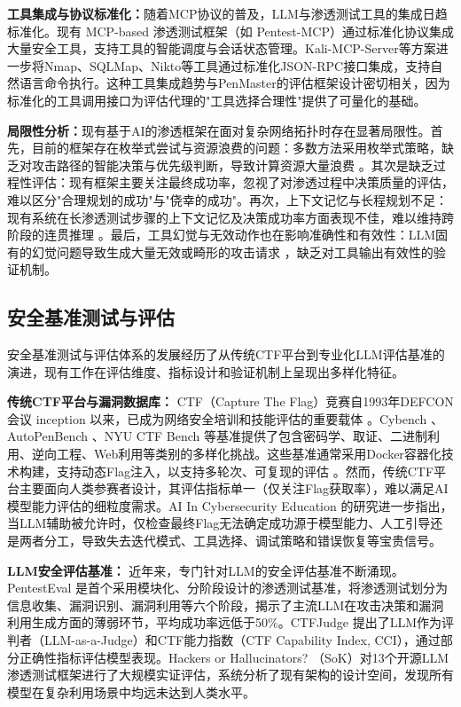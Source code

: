 \documentclass[a4paper, twocolumn]{article}
\begin{document}
\textbf{工具集成与协议标准化：}随着MCP协议的普及，LLM与渗透测试工具的集成日趋标准化。现有 MCP-based 渗透测试框架（如 Pentest-MCP）通过标准化协议集成大量安全工具，支持工具的智能调度与会话状态管理。Kali-MCP-Server等方案进一步将Nmap、SQLMap、Nikto等工具通过标准化JSON-RPC接口集成，支持自然语言命令执行。这种工具集成趋势与PenMaster的评估框架设计密切相关，因为标准化的工具调用接口为评估代理的"工具选择合理性"提供了可量化的基础。

\textbf{局限性分析：}现有基于AI的渗透框架在面对复杂网络拓扑时存在显著局限性。首先，目前的框架存在枚举式尝试与资源浪费的问题：多数方法采用枚举式策略，缺乏对攻击路径的智能决策与优先级判断，导致计算资源大量浪费 \cite{yang2021pentesteval}。其次是缺乏过程性评估：现有框架主要关注最终成功率，忽视了对渗透过程中决策质量的评估，难以区分"合理规划的成功"与"侥幸的成功"。再次，上下文记忆与长程规划不足：现有系统在长渗透测试步骤的上下文记忆及决策成功率方面表现不佳，难以维持跨阶段的连贯推理 \cite{liu2026memory}\cite{yuan2026amabench}。最后，工具幻觉与无效动作也在影响准确性和有效性：LLM固有的幻觉问题导致生成大量无效或畸形的攻击请求 \cite{happe2025benchmarking}，缺乏对工具输出有效性的验证机制。
\subsection{安全基准测试与评估}
安全基准测试与评估体系的发展经历了从传统CTF平台到专业化LLM评估基准的演进，现有工作在评估维度、指标设计和验证机制上呈现出多样化特征。

\textbf{传统CTF平台与漏洞数据库：} CTF（Capture The Flag）竞赛自1993年DEFCON会议 inception 以来，已成为网络安全培训和技能评估的重要载体 \cite{shao2024nyuctf}。Cybench \cite{shao2024cybench}、AutoPenBench \cite{chen2024autopenbench} 、NYU CTF Bench \cite{shao2024nyuctf}等基准提供了包含密码学、取证、二进制利用、逆向工程、Web利用等类别的多样化挑战。这些基准通常采用Docker容器化技术构建，支持动态Flag注入，以支持多轮次、可复现的评估 \cite{shao2024nyuctf}。然而，传统CTF平台主要面向人类参赛者设计，其评估指标单一（仅关注Flag获取率），难以满足AI模型能力评估的细粒度需求。AI In Cybersecurity Education \cite{xi2026ai} 的研究进一步指出，当LLM辅助被允许时，仅检查最终Flag无法确定成功源于模型能力、人工引导还是两者分工，导致失去迭代模式、工具选择、调试策略和错误恢复等宝贵信号。

\textbf{LLM安全评估基准：}  近年来，专门针对LLM的安全评估基准不断涌现。PentestEval \cite{yang2021pentesteval} 是首个采用模块化、分阶段设计的渗透测试基准，将渗透测试划分为信息收集、漏洞识别、漏洞利用等六个阶段，揭示了主流LLM在攻击决策和漏洞利用生成方面的薄弱环节，平均成功率远低于50\%。CTFJudge \cite{wang2025ctfjudge} 提出了LLM作为评判者（LLM-as-a-Judge）和CTF能力指数（CTF Capability Index, CCI），通过部分正确性指标评估模型表现。Hackers or Hallucinators? \cite{wang2026hackers}（SoK）对13个开源LLM渗透测试框架进行了大规模实证评估，系统分析了现有架构的设计空间，发现所有模型在复杂利用场景中均远未达到人类水平。
\end{document}
